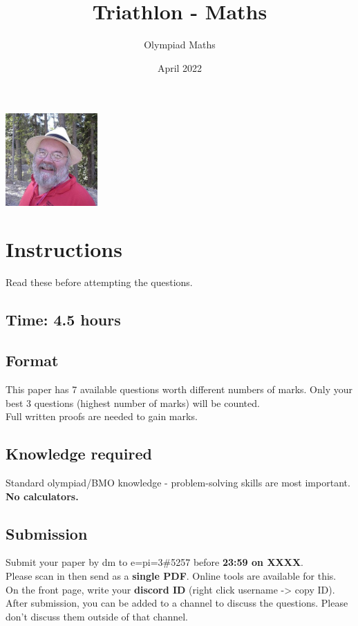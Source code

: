 \documentclass{exam}
\title{Triathlon - Maths}
\author{Olympiad Maths}
\date{April 2022}
\begin{document}
\large
\maketitle

\begin{center}
    \vspace{-10pt}
    \includegraphics[height=100pt]{geoffsmith}
    \vspace{-10pt}
\end{center}

\section* {Instructions}

Read these before attempting the questions.

\subsection*{Time: 4.5 hours}

\subsection*{Format}
This paper has 7 available questions worth different numbers of marks. Only your best 3 questions (highest number of marks) will be counted.\\
Full written proofs are needed to gain marks.

\subsection*{Knowledge required}
Standard olympiad/BMO knowledge - problem-solving skills are most important.\\
\textbf{No calculators.}

\subsection*{Submission}
Submit your paper by dm to
{\selectfont e=pi=3\#5257}
before \textbf{23:59 on XXXX}.\\
Please scan in then send as a \textbf{single PDF}. Online tools are available for this.\\
On the front page, write your \textbf{discord ID} (right click username -> copy ID).\\
After submission, you can be added to a channel to discuss the questions. Please don't discuss them outside of that channel.
\end{document}
